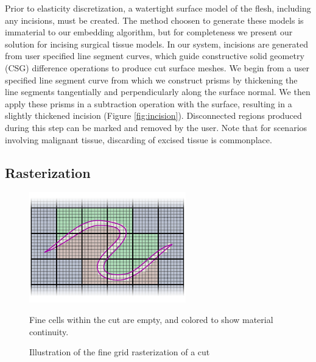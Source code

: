Prior to elasticity discretization, a watertight surface model of the
flesh, including any incisions, must be created. The method choosen to
generate these models is immaterial to our embedding algorithm, but
for completeness we present our solution for incising surgical tissue
models. In our system, incisions are generated from user specified
line segment curves, which guide constructive solid geometry (CSG)
difference operations to produce cut surface meshes.  We begin from a
user specified line segment curve from which we construct prisms by
thickening the line segments tangentially and perpendicularly along
the surface normal. We then apply these prisms in a subtraction
operation with the surface, resulting in a slightly thickened incision
(Figure \ref{fig:incision}). Disconnected regions produced during this
step can be marked and removed by the user. Note that for scenarios
involving malignant tissue, discarding of excised tissue is
commonplace.

\subsection{Rasterization}

\begin{figure}
  \centering
  \includegraphics[width=\columnwidth]{chapter_gridiron/images/Figure_Topology_C}
  \caption{Illustration of the fine grid rasterization of a cut}{Fine cells within the cut are empty, and colored to show material continuity.}
\label{Fig:CuttingFineGrid}
\end{figure}


